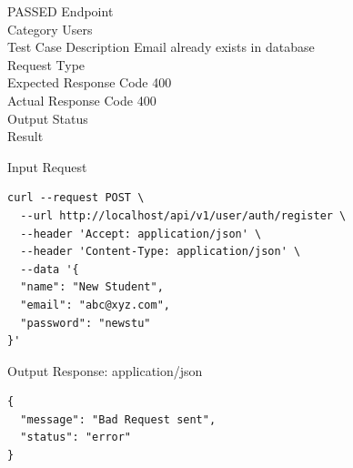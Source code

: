 \begin{testcase}{52}{PASSED}
Endpoint \hfill {}\\
Category \hfill Users\\
Test Case Description \hfill Email already exists in database\\

Request Type    \hfill {}\\
Expected Response Code    \hfill 400\\
Actual Response Code    \hfill 400\\

Output Status \hfill {}\\
Result \hfill {}

\begin{ipblock}{Input Request}
\begin{verbatim}
curl --request POST \
  --url http://localhost/api/v1/user/auth/register \
  --header 'Accept: application/json' \
  --header 'Content-Type: application/json' \
  --data '{
  "name": "New Student",
  "email": "abc@xyz.com",
  "password": "newstu"
}'
\end{verbatim}
\end{ipblock}

\begin{opblock}{Output Response: application/json}
\begin{verbatim}
{
  "message": "Bad Request sent",
  "status": "error"
}
\end{verbatim}
\end{opblock}
\end{testcase}

